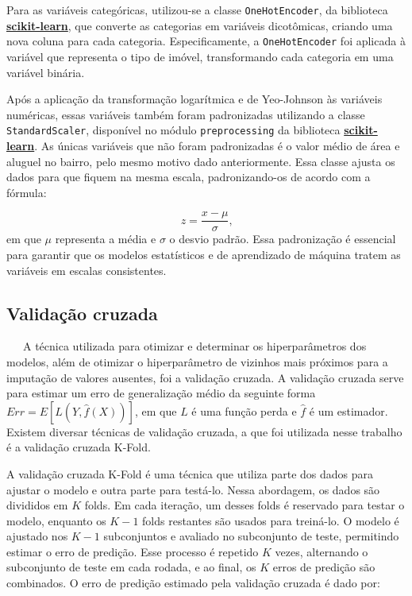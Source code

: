 \documentclass[
  12pt,
  a4paper,
]{scrreprt}
\begin{document}
\vspace{12pt}

Para as variáveis categóricas, utilizou-se a classe
\texttt{OneHotEncoder}, da biblioteca
\href{https://scikit-learn.org/stable/}{\textbf{scikit-learn}}, que
converte as categorias em variáveis dicotômicas, criando uma nova coluna
para cada categoria. Especificamente, a \texttt{OneHotEncoder} foi
aplicada à variável que representa o tipo de imóvel, transformando cada
categoria em uma variável binária.

\vspace{12pt}

Após a aplicação da transformação logarítmica e de Yeo-Johnson às
variáveis numéricas, essas variáveis também foram padronizadas
utilizando a classe \texttt{StandardScaler}, disponível no módulo
\texttt{preprocessing} da biblioteca
\href{https://scikit-learn.org/stable/}{\textbf{scikit-learn}}. As
únicas variáveis que não foram padronizadas é o valor médio de área e
aluguel no bairro, pelo mesmo motivo dado anteriormente. Essa classe
ajusta os dados para que fiquem na mesma escala, padronizando-os de
acordo com a fórmula:

\[
z = \frac{x - \mu}{\sigma}\text{,}
\] em que \(\mu\) representa a média e \(\sigma\) o desvio padrão. Essa
padronização é essencial para garantir que os modelos estatísticos e de
aprendizado de máquina tratem as variáveis em escalas consistentes.

\subsection{Validação cruzada}\label{validauxe7uxe3o-cruzada}

~~~A técnica utilizada para otimizar e determinar os hiperparâmetros dos
modelos, além de otimizar o hiperparâmetro de vizinhos mais próximos
para a imputação de valores ausentes, foi a validação cruzada. A
validação cruzada serve para estimar um erro de generalização médio da
seguinte forma
\(Err = E\left[L\left(Y, \hat{f}\left(X\right)\right)\right]\), em que
\(L\) é uma função perda e \(\hat f\) é um estimador. Existem diversar
técnicas de validação cruzada, a que foi utilizada nesse trabalho é a
validação cruzada K-Fold.

\vspace{12pt}

A validação cruzada K-Fold é uma técnica que utiliza parte dos dados
para ajustar o modelo e outra parte para testá-lo. Nessa abordagem, os
dados são divididos em \(K\) folds. Em cada iteração, um desses folds é
reservado para testar o modelo, enquanto os \(K−1\) folds restantes são
usados para treiná-lo. O modelo é ajustado nos \(K−1\) subconjuntos e
avaliado no subconjunto de teste, permitindo estimar o erro de predição.
Esse processo é repetido \(K\) vezes, alternando o subconjunto de teste
em cada rodada, e ao final, os \(K\) erros de predição são combinados. O
erro de predição estimado pela validação cruzada é dado por:
\end{document}
